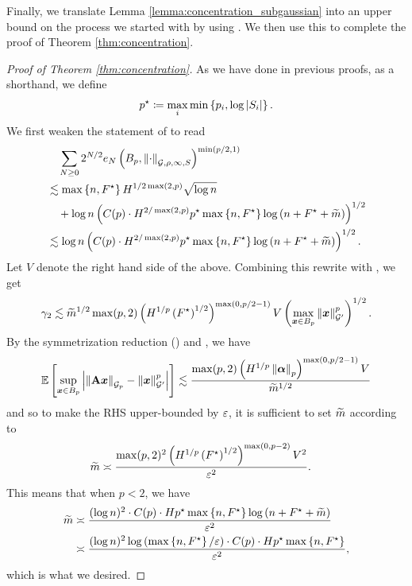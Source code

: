 \documentclass[11pt]{article}
\numberwithin{equation}{section}
\begin{document}
Finally, we translate Lemma \ref{lemma:concentration_subgaussian} into an upper bound on the process we started with by using . We then use this to complete the proof of Theorem \ref{thm:concentration}.

\begin{proof}[Proof of Theorem \ref{thm:concentration}]
As we have done in previous proofs, as a shorthand, we define
\begin{align*}
    p^{\star} \coloneqq \max_{i}\min\left\{p_i,\log\left\lvert S_i \right\rvert\right\}.
\end{align*}
We first weaken the statement of  to read
\begin{align*}
    &\quad\sum_{N \ge 0} 2^{N/2}e_N\left(B_p, \left\lVert \cdot \right\rVert_{\mathcal{G},\rho,\infty, S}\right)^{\min(p/2,1)} \\
    &\lesssim \max\left\{n,F^{\star}\right\}H^{1/2\max(2,p)}\sqrt{\log n} \\
    &\quad+ \log n \left(C(p) \cdot H^{2/\max(2,p)}p^{\star}\max\left\{n,F^{\star}\right\}\log\left(n + F^{\star} + \widetilde{m}\right)\right)^{1/2} \\
    &\lesssim \log n \left(C(p) \cdot H^{2/\max(2,p)}p^{\star}\max\left\{n,F^{\star}\right\}\log\left(n + F^{\star} + \widetilde{m}\right)\right)^{1/2}.
\end{align*}
Let $V$ denote the right hand side of the above. Combining this rewrite with , we get
\begin{align*}
    \gamma_2 \lesssim {\widetilde{m}}^{1/2}\max(p,2) \left(H^{1/p}\left(F^{\star}\right)^{1/2}\right)^{\max(0,p/2-1)}V\left(\max_{\bm{x} \in B_{p}}\left\lVert \bm{x} \right\rVert_{\mathcal{G}'}^p\right)^{1/2}.
\end{align*}
By the symmetrization reduction () and , we have
\begin{align*}
    \mathbb{E}\left[\sup_{\bm{x}\in B_p} \left\lvert \left\lVert \mathbf{A}\bm{x} \right\rVert_{\mathcal{G}_{p}}-\left\lVert \bm{x} \right\rVert_{\mathcal{G}'}^p \right\rvert\right] \lesssim \frac{\max(p,2) \left(H^{1/p}\left\lVert \bm{\alpha} \right\rVert_p\right)^{\max(0,p/2-1)}V}{\widetilde{m}^{1/2}}
\end{align*}
and so to make the RHS upper-bounded by $\varepsilon$, it is sufficient to set $\widetilde{m}$ according to
\begin{align*}
    \widetilde{m} &\asymp \frac{\max(p,2)^2 \left(H^{1/p}\left(F^{\star}\right)^{1/2}\right)^{\max(0,p-2)}V^2}{\varepsilon^2}.
\end{align*}
This means that when $p < 2$, we have
\begin{align*}
    \widetilde{m} &\asymp \frac{(\log n)^2\cdot C(p) \cdot Hp^{\star}\max\left\{n,F^{\star}\right\}\log\left(n + F^{\star} + \widetilde{m}\right)}{\varepsilon^2} \\
    &\asymp \frac{(\log n)^2\log\left(\max\left\{n,F^{\star}\right\}/\varepsilon\right)\cdot C(p) \cdot Hp^{\star}\max\left\{n,F^{\star}\right\}}{\varepsilon^2},
\end{align*}
which is what we desired.


\end{proof}
\end{document}

